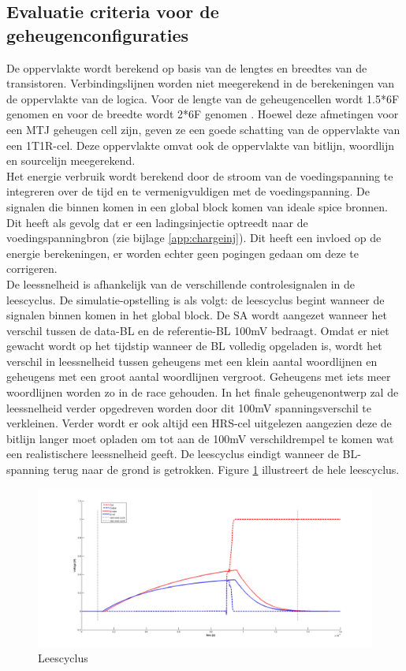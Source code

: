 \subsection{Evaluatie criteria voor de geheugenconfiguraties}
De oppervlakte wordt berekend op basis van de lengtes en breedtes van de transistoren. Verbindingslijnen worden niet meegerekend in de berekeningen van de oppervlakte van de logica. Voor de lengte van de geheugencellen wordt 1.5*6F genomen en voor de breedte wordt 2*6F genomen \cite{ppt:cosemans}. Hoewel deze afmetingen voor een MTJ geheugen cell zijn, geven ze een goede schatting van de oppervlakte van een 1T1R-cel. Deze oppervlakte omvat ook de oppervlakte van bitlijn, woordlijn en sourcelijn meegerekend. \\
Het energie verbruik wordt berekend door de stroom van de voedingspanning te integreren over de tijd en te vermenigvuldigen met de voedingspanning. De signalen die binnen komen in een global block komen van ideale spice bronnen. Dit heeft als gevolg dat er een ladingsinjectie optreedt naar de voedingspanningbron (zie bijlage \ref{app:chargeinj}). Dit heeft een invloed op de energie berekeningen, er worden echter geen pogingen gedaan om deze te corrigeren. \\
De leessnelheid is afhankelijk van de verschillende controlesignalen in de leescyclus. De simulatie-opstelling is als volgt: de leescyclus begint wanneer de signalen binnen komen in het global block. De SA wordt aangezet wanneer het verschil tussen de data-BL en de referentie-BL 100mV bedraagt. Omdat er niet gewacht wordt op het tijdstip wanneer de BL volledig opgeladen is, wordt het verschil in leessnelheid tussen geheugens met een klein aantal woordlijnen en geheugens met een groot aantal woordlijnen vergroot. Geheugens met iets meer woordlijnen worden zo in de race gehouden. In het finale geheugenontwerp zal de leessnelheid verder opgedreven worden door dit 100mV spanningsverschil te verkleinen. Verder wordt er ook altijd een HRS-cel uitgelezen aangezien deze de bitlijn langer moet opladen om tot aan de 100mV verschildrempel te komen wat een realistischere leessnelheid geeft. De leescyclus eindigt wanneer de BL-spanning terug naar de grond is getrokken. Figure \ref{fig:leescyclus} illustreert de hele leescyclus.

\begin{figure}[!ht]
  \centering
  \includegraphics[scale=0.6]{../fig/hfdstk-timing-leescyclus.png}
  \caption[Leescyclus]{Leescyclus}
  \label{fig:leescyclus}
\end{figure} 

